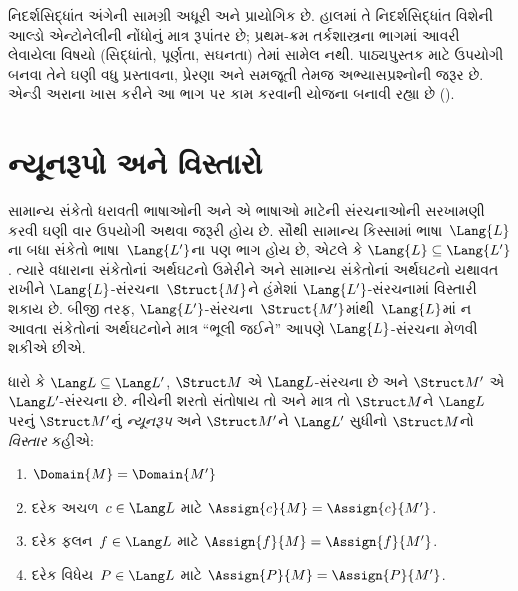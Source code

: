 
\label{guunit:OLP-0182}


\begin{editorial}
  નિદર્શસિદ્ધાંત અંગેની સામગ્રી અધૂરી અને પ્રાયોગિક છે. હાલમાં તે
  નિદર્શસિદ્ધાંત વિશેની આલ્ડો એન્ટોનેલીની નોંધોનું માત્ર રૂપાંતર છે;
  પ્રથમ-ક્રમ તર્કશાસ્ત્રના ભાગમાં આવરી લેવાયેલા વિષયો (સિદ્ધાંતો,
  પૂર્ણતા, સઘનતા) તેમાં સામેલ નથી. પાઠ્યપુસ્તક માટે ઉપયોગી બનવા તેને
  ઘણી વધુ પ્રસ્તાવના, પ્રેરણા અને સમજૂતી તેમજ અભ્યાસપ્રશ્નોની જરૂર છે.
  એન્ડી અરાના ખાસ કરીને આ ભાગ પર કામ કરવાની યોજના બનાવી રહ્યા છે
  ().
\end{editorial}

\begingroup
\makeatletter{}\makeatother

\label{guunit:OLP-0183}


\begingroup
\makeatletter{}\makeatother

\section{ન્યૂનરૂપો અને વિસ્તારો}
\label{guunit:OLP-0184}


સામાન્ય સંકેતો ધરાવતી ભાષાઓની અને એ ભાષાઓ માટેની સંરચનાઓની
સરખામણી કરવી ઘણી વાર ઉપયોગી અથવા જરૂરી હોય છે. સૌથી સામાન્ય કિસ્સામાં
ભાષા~$\Lang{L}$ના બધા સંકેતો ભાષા~$\Lang{L'}$ના પણ
ભાગ હોય છે, એટલે કે $\Lang{L} \subseteq \Lang{L'}$. ત્યારે વધારાના
સંકેતોનાં અર્થઘટનો ઉમેરીને અને સામાન્ય સંકેતોનાં અર્થઘટનો યથાવત રાખીને
$\Lang{L}$-સંરચના~$\Struct{M}$ને હંમેશાં
$\Lang{L'}$-સંરચનામાં વિસ્તારી શકાય છે. બીજી તરફ,
$\Lang{L'}$-સંરચના~$\Struct{M'}$માંથી~$\Lang{L}$માં ન આવતા સંકેતોનાં
અર્થઘટનોને માત્ર ``ભૂલી જઈને'' આપણે $\Lang{L}$-સંરચના મેળવી શકીએ છીએ.

\begin{defn}
ધારો કે $\Lang L \subseteq \Lang L'$, $\Struct M$ એ
$\Lang L$-સંરચના છે અને $\Struct M'$ એ
$\Lang L'$-સંરચના છે. નીચેની શરતો સંતોષાય તો અને માત્ર તો
$\Struct M$ને $\Lang L$ પરનું $\Struct M'$નું \emph{ન્યૂનરૂપ} અને
$\Struct M'$ને $\Lang L'$ સુધીનો $\Struct M$નો \emph{વિસ્તાર} કહીએ:
\begin{enumerate}
\item $\Domain{M} = \Domain{M'}$
\item દરેક અચળ~$c \in \Lang L$ માટે $\Assign{c}{M} =
  \Assign{c}{M'}$.
\item દરેક ફલન~$f \in \Lang L$ માટે $\Assign{f}{M} =
  \Assign{f}{M'}$.
\item દરેક વિધેય~$P \in \Lang L$ માટે $\Assign{P}{M} =
  \Assign{P}{M'}$.
\end{enumerate}
\end{defn}

